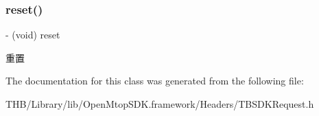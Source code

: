 \subsubsection{\texorpdfstring{reset()}{reset()}}
{\footnotesize\ttfamily -\/ (void) reset \begin{DoxyParamCaption}{ }\end{DoxyParamCaption}}

重置 

The documentation for this class was generated from the following file\+:\begin{DoxyCompactItemize}
\item 
T\+H\+B/\+Library/lib/\+Open\+Mtop\+S\+D\+K.\+framework/\+Headers/T\+B\+S\+D\+K\+Request.\+h\end{DoxyCompactItemize}
